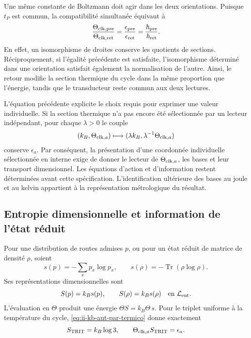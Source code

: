 Une même constante de Boltzmann doit agir dans les deux orientations.
Puisque \(t_P\) est commun, la compatibilité simultanée équivaut à
\begin{equation}
 \frac{\Theta_{{\rm clk},{\rm pre}}}{\Theta_{{\rm clk},{\rm ret}}}
 =\frac{\epsilon_{\rm pre}}{\epsilon_{\rm ret}}
 =\frac{\hbar_{\rm pre}}{\hbar_{\rm ret}}.
 \label{eq:ii-kb-aut-orientaciones}
\end{equation}
En effet, un isomorphisme de droites conserve les quotients de sections. Réciproquement, si l'égalité précédente est satisfaite, l'isomorphisme déterminé dans une orientation satisfait également la normalisation de l'autre. Ainsi, le retour modifie la section thermique du cycle dans la même proportion que l'énergie, tandis que le transducteur reste commun aux deux lectures.

L’équation précédente explicite le choix requis pour exprimer une
valeur individuelle. Si la section thermique n’a pas encore été sélectionnée
par un lecteur indépendant, pour chaque \(\lambda>0\) le couple
\[
 (k_B,\Theta_{{\rm clk},a})
 \longmapsto(\lambda k_B,\lambda^{-1}\Theta_{{\rm clk},a})
\]
conserve \(\epsilon_a\). Par conséquent, la présentation d’une
coordonnée individuelle sélectionnée en interne exige de donner le lecteur de
\(\Theta_{{\rm clk},a}\), les bases et leur transport dimensionnel.
Les équations d’action et d’information restent déterminées avant
cette spécification. L’identification ultérieure des bases au
joule et au kelvin appartient à la représentation métrologique du résultat.

\subsection{Entropie dimensionnelle et information de l'état réduit}

Pour une distribution de routes admises \(p\), ou pour un état réduit de matrice de densité \(\rho\), soient
\[
 s(p)=-\sum_xp_x\log p_x,\qquad
 s(\rho)=-\operatorname{Tr}(\rho\log\rho).
\]
Ses représentations dimensionnelles sont
\begin{equation}
 S(p)=k_Bs(p),\qquad S(\rho)=k_Bs(\rho)
 \quad\text{en }\mathcal L_{\rm ent}.
 \label{eq:ii-kb-aut-entropia}
\end{equation}
L'évaluation en \(\Theta\) produit une énergie
\(\Theta S=k_B\Theta\,s\). Pour le triplet uniforme à la température
du cycle, \eqref{eq:ii-kb-aut-par-termico} donne exactement
\[
 S_{\rm TRIT}=k_B\log3,\qquad
 \Theta_{{\rm clk},a}S_{\rm TRIT}=\epsilon_a.
\]
